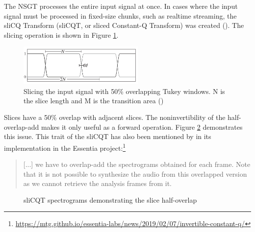 \documentclass[report.tex]{subfiles}
\begin{document}
The NSGT processes the entire input signal at once. In cases where the input signal must be processed in fixed-size chunks, such as realtime streaming, the sliCQ Transform (sliCQT, or sliced Constant-Q Transform) was created (\cite{invertiblecqt, slicq}). The slicing operation is shown in Figure \ref{fig:slicqtukeys}.

\begin{figure}[ht]
	\centering
	\includegraphics[width=0.55\textwidth]{./images-misc/slicq_windows.png}
	\caption{Slicing the input signal with 50\% overlapping Tukey windows. N is the slice length and M is the transition area (\cite{slicq})}
	\label{fig:slicqtukeys}
\end{figure}

Slices have a 50\% overlap with adjacent slices. The noninvertibility of the half-overlap-add makes it only useful as a forward operation. Figure \ref{fig:slicqoverlaps} demonstrates this issue. This trait of the sliCQT has also been mentioned by in its implementation in the Essentia project:\footnote{\url{https://mtg.github.io/essentia-labs/news/2019/02/07/invertible-constant-q/}}

\begin{quote}
	[...] we have to overlap-add the spectrograms obtained for each frame. Note that it is not possible to synthesize the audio from this overlapped version as we cannot retrieve the analysis frames from it.
\end{quote}

\begin{figure}[ht]
	\centering
	\hspace{0.1em}
	\caption{sliCQT spectrograms demonstrating the slice half-overlap}
	\label{fig:slicqoverlaps}
\end{figure}
\end{document}

